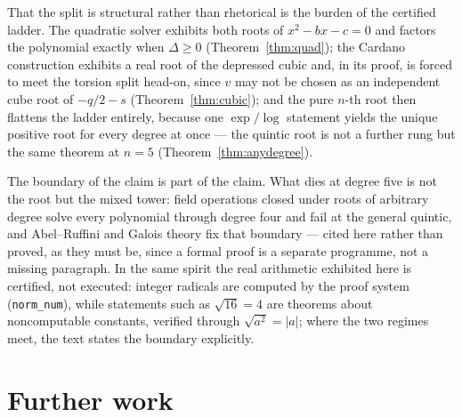 \documentclass[submission,noinfoline]{jsfds}
\newcommand{\abs}[1]{\lvert #1\rvert}
\begin{document}
That the split is structural rather than rhetorical is the burden of the
certified ladder. The quadratic solver exhibits both roots of
$x^2-bx-c=0$ and factors the polynomial exactly when $\Delta\ge0$
(Theorem~\ref{thm:quad}); the Cardano construction exhibits a real root
of the depressed cubic and, in its proof, is forced to meet the torsion
split head-on, since $v$ may not be chosen as an independent cube root
of $-q/2-s$ (Theorem~\ref{thm:cubic}); and the pure $n$-th root then
flattens the ladder entirely, because one $\exp/\log$ statement yields
the unique positive root for every degree at once --- the quintic root
is not a further rung but the same theorem at $n=5$
(Theorem~\ref{thm:anydegree}).

The boundary of the claim is part of the claim. What dies at degree five
is not the root but the mixed tower: field operations closed under roots
of arbitrary degree solve every polynomial through degree four and fail
at the general quintic, and Abel--Ruffini and Galois theory
\citep{Abel1824,Galois1846} fix that boundary --- cited here rather than
proved, as they must be, since a formal proof is a separate programme,
not a missing paragraph. In the same spirit the real arithmetic
exhibited here is certified, not executed: integer radicals are computed
by the proof system (\texttt{norm\_num}), while statements such as
$\sqrt{16}=4$ are theorems about noncomputable constants, verified
through $\sqrt{a^2}=\abs a$; where the two regimes meet, the text states
the boundary explicitly.

\section{Further work}\label{sec:future}
\end{document}
